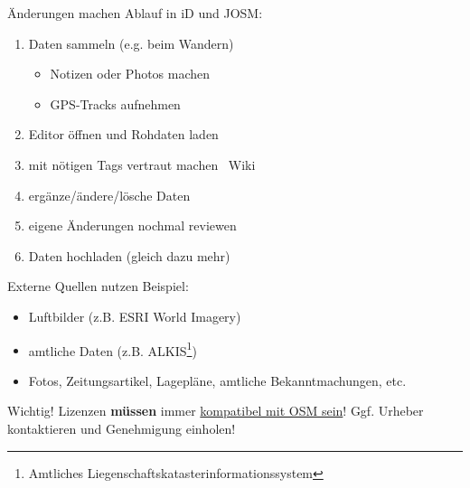 \documentclass{beamer}
\begin{document}
			\begin{frame}{Änderungen machen}
				Ablauf in iD und JOSM:
				\begin{enumerate}
					\item Daten sammeln (e.g. beim Wandern)
					\begin{itemize}
						\item Notizen oder Photos machen
						\item GPS-Tracks aufnehmen
					\end{itemize}\pause
					\item Editor öffnen und Rohdaten laden\pause
					\item mit nötigen Tags vertraut machen \textrightarrow\ Wiki\pause
					\item ergänze/ändere/lösche Daten\pause
					\item eigene Änderungen nochmal reviewen\pause
					\item Daten hochladen (gleich dazu mehr)
				\end{enumerate}
			\end{frame}
			
			
			\begin{frame}{Externe Quellen nutzen}
				Beispiel:
				\begin{itemize}
					\item Luftbilder (z.B. ESRI World Imagery)
					\item amtliche Daten (z.B. ALKIS\footnote{Amtliches Liegenschaftskatasterinformationssystem})
					\item Fotos, Zeitungsartikel, Lagepläne, amtliche Bekanntmachungen, etc.
				\end{itemize}
				\pause
				\vspace{0.25cm}
				{
					\begin{block}{Wichtig!}
						Lizenzen \textbf{müssen} immer \href{https://wiki.openstreetmap.org/wiki/Import/ODbL_Compatibility}{kompatibel mit OSM sein}! Ggf. Urheber kontaktieren und Genehmigung einholen!
					\end{block}
				}
			\end{frame}
			
\end{document}
